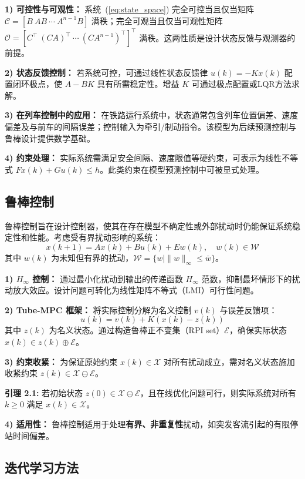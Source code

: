 \textbf{1) 可控性与可观性：} 系统~(\ref{eq:state_space}) 完全可控当且仅当矩阵 $\mathcal{C} = [B\ AB\ \cdots\ A^{n-1}B]$ 满秩；完全可观当且仅当可观性矩阵 $\mathcal{O} = [C^\top\ (CA)^\top\ \cdots\ (CA^{n-1})^\top]^\top$ 满秩。这两性质是设计状态反馈与观测器的前提。

\textbf{2) 状态反馈控制：} 若系统可控，可通过线性状态反馈律 $u(k) = -K x(k)$ 配置闭环极点，使 $A - BK$ 具有所需稳定性。增益 $K$ 可通过极点配置或LQR方法求解。

\textbf{3) 在列车控制中的应用：} 在铁路运行系统中，状态通常包含列车位置偏差、速度偏差及与前车的间隔误差；控制输入为牵引/制动指令。该模型为后续预测控制与鲁棒设计提供数学基础。

\textbf{4) 约束处理：} 实际系统需满足安全间隔、速度限值等硬约束，可表示为线性不等式 $F x(k) + G u(k) \leq h$。此类约束在模型预测控制中可被显式处理。

\subsection{鲁棒控制}

鲁棒控制旨在设计控制器，使其在存在模型不确定性或外部扰动时仍能保证系统稳定性和性能。考虑受有界扰动影响的系统：
\begin{equation}\label{eq:robust_sys}
x(k+1) = A x(k) + B u(k) + E w(k), \quad w(k) \in \mathcal{W}
\end{equation}
其中 $w(k)$ 为未知但有界的扰动，$\mathcal{W} = \{ w \mid \|w\|_\infty \leq \bar{w} \}$。

\textbf{1) $H_\infty$ 控制：} 通过最小化扰动到输出的传递函数 $H_\infty$ 范数，抑制最坏情形下的扰动放大效应。设计问题可转化为线性矩阵不等式（LMI）可行性问题。

\textbf{2) Tube-MPC 框架：} 将实际控制分解为名义控制 $v(k)$ 与误差反馈项：
\[
u(k) = v(k) + K(x(k) - z(k))
\]
其中 $z(k)$ 为名义状态。通过构造鲁棒正不变集（RPI set）$\mathcal{E}$，确保实际状态 $x(k) \in z(k) \oplus \mathcal{E}$。

\textbf{3) 约束收紧：} 为保证原始约束 $x(k) \in \mathcal{X}$ 对所有扰动成立，需对名义状态施加收紧约束 $z(k) \in \mathcal{X} \ominus \mathcal{E}$。

\textbf{引理 2.1\cite{mayne2005robust}:} 若初始状态 $z(0) \in \mathcal{X} \ominus \mathcal{E}$，且在线优化问题可行，则实际系统对所有 $k \geq 0$ 满足 $x(k) \in \mathcal{X}$。

\textbf{4) 适用性：} 鲁棒控制适用于处理\textbf{有界、非重复性}扰动，如突发客流引起的有限停站时间偏差。

\subsection{迭代学习方法}


